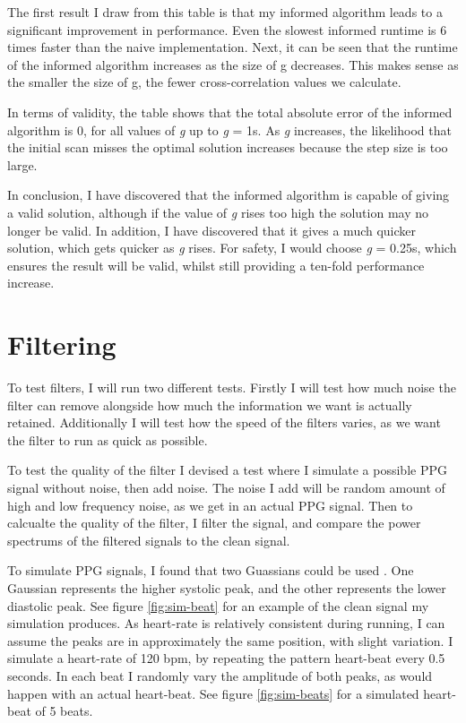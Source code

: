 \documentclass[12pt,a4paper,twoside,openany]{report}
\begin{document}
The first result I draw from this table is that my informed algorithm leads to
a significant improvement in performance. Even the slowest informed runtime is 6
times faster than the naive implementation. Next, it can be seen that the
runtime of the informed algorithm increases as the size of g decreases. This
makes sense as the smaller the size of g, the fewer cross-correlation values
we calculate.

In terms of validity, the table shows that the total absolute error of the
informed algorithm is 0, for all values of \emph{g} up to \emph{g} = 1s. As
\emph{g} increases, the likelihood that the initial scan misses the optimal
solution increases because the step size is too large. 

In conclusion, I have discovered that the informed algorithm is capable of
giving a valid solution, although if the value of \emph{g} rises too high the
solution may no longer be valid. In addition, I have discovered that it gives
a much quicker solution, which gets quicker as \emph{g} rises. For safety, I
would choose \emph{g} = 0.25s, which ensures the result will be valid, whilst
still providing a ten-fold performance increase.


\section{Filtering}

To test filters, I will run two different tests. Firstly I will test how much
noise the filter can remove alongside how much the information we want is
actually retained. Additionally
I will test how the speed of the filters
varies, as we want the filter to run as quick as possible.

To test the quality of the filter I devised a test where I simulate a possible
PPG signal without noise, then add noise. The noise I add will be random
amount of high and low frequency noise, as we get in an actual PPG signal.
Then to calcualte the quality of the filter, I filter the signal, and compare
the power spectrums of the filtered signals to the clean signal.

To simulate PPG signals, I found that two Guassians could be used
\cite{Banerjee15}. One Gaussian represents the higher systolic peak, and the
other represents the lower diastolic peak. 
See figure \ref{fig:sim-beat} for an example of the clean signal my simulation
produces. As heart-rate is relatively
consistent during running, I can assume the peaks are in approximately the
same position, with slight variation. I simulate a heart-rate of 120 bpm, by
repeating the pattern heart-beat every 0.5 seconds. In each beat I randomly
vary the amplitude of both peaks, as would happen with an actual heart-beat.
See figure \ref{fig:sim-beats} for a simulated heart-beat of 5 beats.
\end{document}

